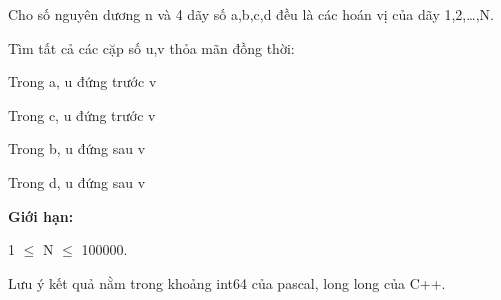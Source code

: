 Cho số nguyên dương n và 4 dãy số a,b,c,d đều là các hoán vị của dãy 1,2,…,N.  

   Tìm tất cả các cặp số u,v thỏa mãn đồng thời:  

   Trong a, u đứng trước v  

   Trong c, u đứng trước v  

   Trong b, u đứng sau v  

   Trong d, u đứng sau v  

\textbf{    Giới hạn:   }

   1  $\le$  N  $\le$  100000.  

   Lưu ý kết quả nằm trong khoảng int64 của pascal, long long của C++.